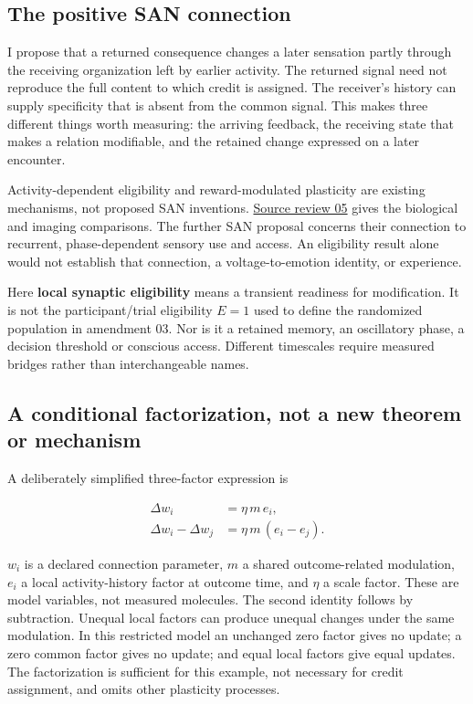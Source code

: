 \documentclass[
  american,
  11pt,
  letterpaper,
]{article}
\begin{document}
\subsection{The positive SAN connection}\label{the-positive-san-connection}

I propose that a returned consequence changes a later sensation partly through the receiving organization left by earlier activity. The returned signal need not reproduce the full content to which credit is assigned. The receiver's history can supply specificity that is absent from the common signal. This makes three different things worth measuring: the arriving feedback, the receiving state that makes a relation modifiable, and the retained change expressed on a later encounter.

Activity-dependent eligibility and reward-modulated plasticity are existing mechanisms, not proposed SAN inventions. \href{https://github.com/v5ma/v5ma.github.io/blob/master/papers/companions/learning-to-feel-v1.0/ARTIFACT-AVAILABILITY.md#artifact-14}{Source review 05} gives the biological and imaging comparisons. The further SAN proposal concerns their connection to recurrent, phase-dependent sensory use and access. An eligibility result alone would not establish that connection, a voltage-to-emotion identity, or experience.

Here \textbf{local synaptic eligibility} means a transient readiness for modification. It is not the participant/trial eligibility \(E=1\) used to define the randomized population in amendment 03. Nor is it a retained memory, an oscillatory phase, a decision threshold or conscious access. Different timescales require measured bridges rather than interchangeable names.

\subsection{A conditional factorization, not a new theorem or mechanism}\label{a-conditional-factorization-not-a-new-theorem-or-mechanism}

A deliberately simplified three-factor expression is

\[\begin{aligned}\Delta w_i&=\eta\,m\,e_i,\\\Delta w_i-\Delta w_j&=\eta\,m\,(e_i-e_j).\end{aligned}\]

\(w_i\) is a declared connection parameter, \(m\) a shared outcome-related modulation, \(e_i\) a local activity-history factor at outcome time, and \(\eta\) a scale factor. These are model variables, not measured molecules. The second identity follows by subtraction. Unequal local factors can produce unequal changes under the same modulation. In this restricted model an unchanged zero factor gives no update; a zero common factor gives no update; and equal local factors give equal updates. The factorization is sufficient for this example, not necessary for credit assignment, and omits other plasticity processes.
\end{document}

